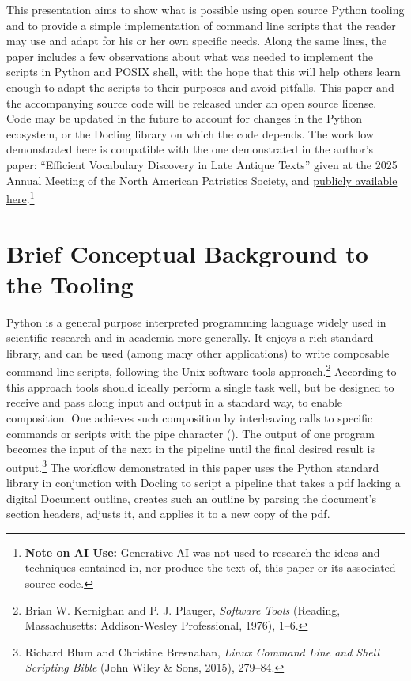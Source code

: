 \documentclass[
  letterpaper,
]{tufte-handout}
\begin{document}
This presentation aims to show what is possible using open source Python
tooling and to provide a simple implementation of command line scripts
that the reader may use and adapt for his or her own specific needs.
Along the same lines, the paper includes a few observations about what
was needed to implement the scripts in Python and POSIX shell, with the
hope that this will help others learn enough to adapt the scripts to
their purposes and avoid pitfalls. This paper and the accompanying
source code will be released under an open source license. Code may be
updated in the future to account for changes in the Python ecosystem, or
the Docling library on which the code depends. The workflow demonstrated
here is compatible with the one demonstrated in the author's paper:
``Efficient Vocabulary Discovery in Late Antique Texts'' given at the
2025 Annual Meeting of the North American Patristics Society, and
\href{https://github.com/theusefulmonk/Vocabulary-Discovery-in-Late-Antique-Texts}{publicly
available here}.\footnote{\textbf{Note on AI Use:} Generative AI was not
  used to research the ideas and techniques contained in, nor produce
  the text of, this paper or its associated source code.}

\section{Brief Conceptual Background to the
Tooling}\label{brief-conceptual-background-to-the-tooling}

Python is a general purpose interpreted programming language widely used
in scientific research and in academia more generally. It enjoys a rich
standard library, and can be used (among many other applications) to
write composable command line scripts, following the Unix software tools
approach.\footnote{Brian W. Kernighan and P. J. Plauger, \emph{Software
  Tools} (Reading, Massachusetts: Addison-Wesley Professional, 1976),
  1--6.} According to this approach tools should ideally perform a
single task well, but be designed to receive and pass along input and
output in a standard way, to enable composition. One achieves such
composition by interleaving calls to specific commands or scripts with
the pipe character (\texttt{\textbar{}}). The output of one program
becomes the input of the next in the pipeline until the final desired
result is output.\footnote{Richard Blum and Christine Bresnahan,
  \emph{Linux Command Line and Shell Scripting Bible} (John Wiley \&
  Sons, 2015), 279--84.} The workflow demonstrated in this paper uses
the Python standard library in conjunction with Docling to script a
pipeline that takes a pdf lacking a digital Document outline, creates
such an outline by parsing the document's section headers, adjusts it,
and applies it to a new copy of the pdf.
\end{document}
